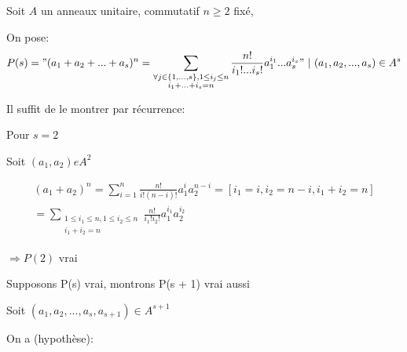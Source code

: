 
Soit $A$ un anneaux unitaire, commutatif $n \geq 2$ fixé,

On pose:
\[
 P(s) = "(a_1 + a_2 + ... + a_s)^n = \sum_{\substack{\forall j \in \{1, ..., s\}, 1 \leq i_j \leq n \\ i_1 + ... + i_s = n}} \frac{n!}{i_1!...i_s!}a_1^{i_1}...a_s^{i_s}"\ |\ (a_1, a_2, ..., a_s) \in A^s
\]


Il suffit de le montrer par récurrence:

Pour $s = 2$

Soit $(a_1, a_2) e A^2$

\[
\begin{aligned}
  (a_1 + a_2)^n = \sum_{i=1}^{n} \frac{n!}{i!(n - i)!} a_1^{i}a_2^{n - i} = [i_1 = i, i_2 = n - i, i_1 + i_2 = n] \\
  = \sum_{\substack{1 \leq i_1 \leq n, 1 \leq i_2 \leq n  \\ i_1 + i_2 = n}} \frac{n!}{i_1!i_2!}a_1^{i_1}a_2^{i_2}
\end{aligned}
\]

$\Longrightarrow P(2)$ vrai

Supposons P(s) vrai, montrons P(s + 1) vrai aussi

Soit $(a_1, a_2, ..., a_s, a_{s+ 1}) \in A^{s + 1}$

On a (hypothèse):



